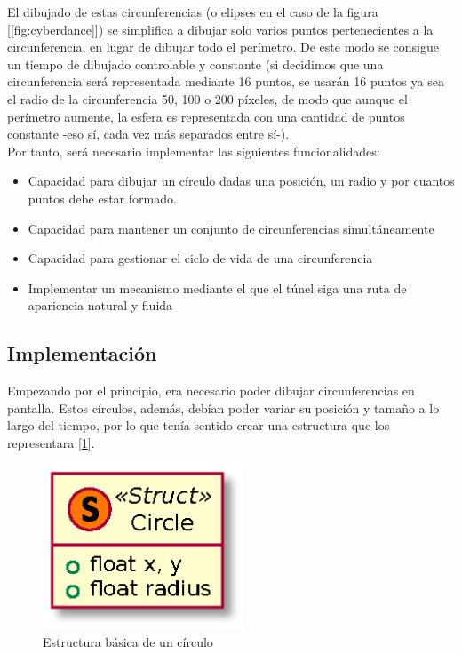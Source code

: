 El dibujado de estas circunferencias (o elipses en el caso de la figura [\ref{fig:cyberdance}]) se simplifica a dibujar solo varios puntos pertenecientes a la circunferencia, en lugar de dibujar todo el perímetro. De este modo se consigue un tiempo de dibujado controlable y constante (si decidimos que una circunferencia será representada mediante 16 puntos, se usarán 16 puntos ya sea el radio de la circunferencia 50, 100 o 200 píxeles, de modo que aunque el perímetro aumente, la esfera es representada con una cantidad de puntos constante -eso sí, cada vez más separados entre sí-).\\

Por tanto, será necesario implementar las siguientes funcionalidades:
\begin{itemize}
	\item Capacidad para dibujar un círculo dadas una posición, un radio y por cuantos puntos debe estar formado.
	\item Capacidad para mantener un conjunto de circunferencias simultáneamente
	\item Capacidad para gestionar el ciclo de vida de una circunferencia
	\item Implementar un mecanismo mediante el que el túnel siga una ruta de apariencia natural y fluida
\end{itemize}

\subsection{Implementación}

Empezando por el principio, era necesario poder dibujar circunferencias en pantalla. Estos círculos, además, debían poder variar su posición y tamaño a lo largo del tiempo, por lo que tenía sentido crear una estructura que los representara [\ref{fig:circleuml}].\\

%
%
%

\begin{figure}[h]
	\centering
	\includegraphics[width=6cm]{archivos/circleuml}
	\caption{Estructura básica de un círculo}
	\label{fig:circleuml}
\end{figure}

